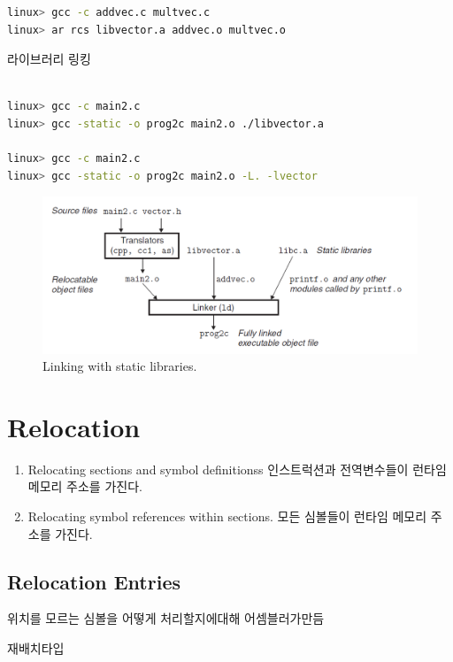 \begin{lstlisting}[language=bash]
linux> gcc -c addvec.c multvec.c
linux> ar rcs libvector.a addvec.o multvec.o
\end{lstlisting}

라이브러리 링킹

\begin{lstlisting}[language=bash]
    
linux> gcc -c main2.c
linux> gcc -static -o prog2c main2.o ./libvector.a

linux> gcc -c main2.c
linux> gcc -static -o prog2c main2.o -L. -lvector

\end{lstlisting}

\begin{figure}[h!]
    \centering
    \includegraphics[scale=0.5]{pic/section7/pic3.png}
    \caption{Linking with static libraries.}
\end{figure}




\section{Relocation}

\begin{enumerate}
    \item Relocating sections and symbol definitionss   인스트럭션과 전역변수들이 런타임 메모리 주소를 가진다.
    \item Relocating symbol references within sections.    
    모든 심볼들이 런타임 메모리 주소를 가진다.
\end{enumerate}

\subsection{Relocation Entries}
위치를 모르는 심볼을 어떻게 처리할지에대해 어셈블러가만듬


재배치타입

